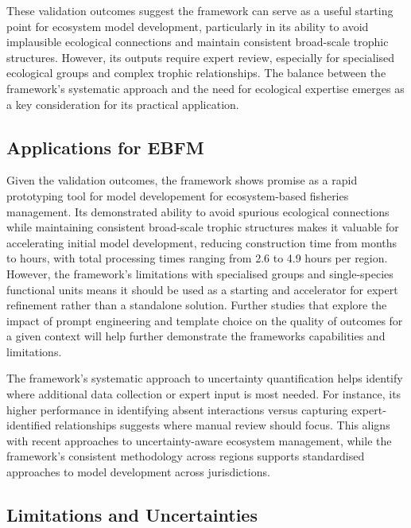 These validation outcomes suggest the framework can serve as a useful starting point for ecosystem model development, particularly in its ability to avoid implausible ecological connections and maintain consistent broad-scale trophic structures. However, its outputs require expert review, especially for specialised ecological groups and complex trophic relationships. The balance between the framework's systematic approach and the need for ecological expertise emerges as a key consideration for its practical application.

\subsection{Applications for EBFM}

Given the validation outcomes, the framework shows promise as a rapid prototyping tool for model developement for ecosystem-based fisheries management. Its demonstrated ability to avoid spurious ecological connections while maintaining consistent broad-scale trophic structures makes it valuable for accelerating initial model development, reducing construction time from months to hours, with total processing times ranging from 2.6 to 4.9 hours per region. However, the framework's limitations with specialised groups and single-species functional units means it should be used as a starting and accelerator for expert refinement rather than a standalone solution. Further studies that explore the impact of prompt engineering and template choice on the quality of outcomes for a given context will help further demonstrate the frameworks capabilities and limitations.

The framework's systematic approach to uncertainty quantification helps identify where additional data collection or expert input is most needed. For instance, its higher performance in identifying absent interactions versus capturing expert-identified relationships suggests where manual review should focus. This aligns with recent approaches to uncertainty-aware ecosystem management, while the framework's consistent methodology across regions supports standardised approaches to model development across jurisdictions.

\subsection{Limitations and Uncertainties}


